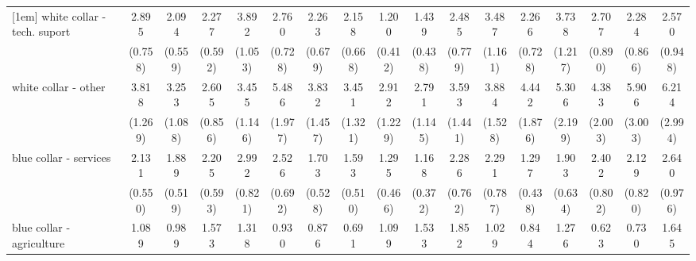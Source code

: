 {\begin{tabular}{l*{16}{c}}
[1em]
white collar - tech. suport&       2.895\sym{***}&       2.094\sym{**} &       2.277\sym{**} &       3.892\sym{***}&       2.760\sym{***}&       2.263\sym{**} &       2.158\sym{*}  &       1.200         &       1.439         &       2.485\sym{**} &       3.487\sym{***}&       2.266\sym{*}  &       3.738\sym{***}&       2.707\sym{**} &       2.284\sym{*}  &       2.570\sym{*}  \\
                    &     (0.758)         &     (0.559)         &     (0.592)         &     (1.053)         &     (0.728)         &     (0.679)         &     (0.668)         &     (0.412)         &     (0.438)         &     (0.779)         &     (1.161)         &     (0.728)         &     (1.217)         &     (0.890)         &     (0.866)         &     (0.948)         \\
[1em]
white collar - other&       3.818\sym{***}&       3.253\sym{***}&       2.605\sym{**} &       3.455\sym{***}&       5.486\sym{***}&       3.832\sym{***}&       3.451\sym{**} &       2.912\sym{*}  &       2.791\sym{*}  &       3.593\sym{**} &       3.884\sym{***}&       4.442\sym{***}&       5.306\sym{***}&       4.383\sym{**} &       5.906\sym{***}&       6.214\sym{***}\\
                    &     (1.269)         &     (1.088)         &     (0.856)         &     (1.146)         &     (1.977)         &     (1.457)         &     (1.321)         &     (1.229)         &     (1.145)         &     (1.441)         &     (1.528)         &     (1.876)         &     (2.199)         &     (2.003)         &     (3.003)         &     (2.994)         \\
[1em]
blue collar - services&       2.131\sym{**} &       1.889\sym{*}  &       2.205\sym{**} &       2.992\sym{***}&       2.526\sym{***}&       1.703         &       1.593         &       1.295         &       1.168         &       2.286\sym{*}  &       2.291\sym{*}  &       1.297         &       1.903         &       2.402\sym{**} &       2.129\sym{*}  &       2.640\sym{**} \\
                    &     (0.550)         &     (0.519)         &     (0.593)         &     (0.821)         &     (0.692)         &     (0.528)         &     (0.510)         &     (0.466)         &     (0.372)         &     (0.762)         &     (0.787)         &     (0.438)         &     (0.634)         &     (0.802)         &     (0.820)         &     (0.976)         \\
[1em]
blue collar - agriculture&       1.089         &       0.989         &       1.573         &       1.318         &       0.930         &       0.876         &       0.691         &       1.099         &       1.533         &       1.852         &       1.029         &       0.844         &       1.276         &       0.623         &       0.730         &       1.645         \\

\end{tabular}}
